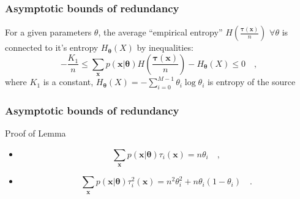 \documentclass[14pt]{beamer}
\renewcommand{\vec}[1]{\ensuremath{\boldsymbol{#1}}}
\begin{document}
\begin{frame}
\frametitle{Asymptotic bounds of redundancy}

\begin{lemma}
For a given parameters $\theta$, the average ``empirical entropy'' $H \left ( \frac {\vec \tau (\vec x)}{n} \right)$ $\forall \theta$ is connected to it's entropy
$H_{\vec \theta}(X)$ by inequalities:
\begin{equation}
\label{lemma} -\frac {K_1}{n} \le
\sum_{\vec x } p(\vec x | \vec \theta)%
H \left ( \frac {\vec \tau (\vec x)}{n} \right)-%
H_{\vec \theta}(X) \le 0 \quad,
\end{equation}
where $K_1$ is a constant, $H_{\vec \theta}(X)=-\sum_{i=0}^{M-1} \theta_i\log \theta_i$ is entropy of the source
\end{lemma}

\end{frame}



\begin{frame}
\frametitle{Asymptotic bounds of redundancy}
Proof of Lemma
\begin{itemize}    

    \item
    \begin{equation}
    \label{matexp}
     \sum_{\vec x } p(\vec x | \vec \theta) \tau_i
    (\vec x)=n\theta_i \quad,
    \end{equation}
    
    \item 
    \begin{equation}
    \label{matexp2}
    \sum_{\vec x } p(\vec x | \vec \theta) \tau_i^2 (\vec x)=%
    n^2\theta_i^2+n\theta_i(1-\theta_i)\quad.
    \end{equation}

\end{itemize}
\end{frame}
\end{document}

